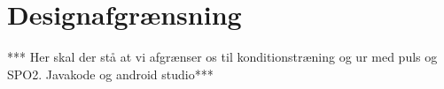 \section{Designafgrænsning}

*** Her skal der stå at vi afgrænser os til konditionstræning og ur med puls og SPO2.  Javakode og android studio*** 